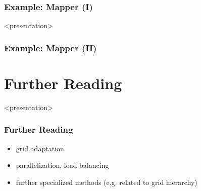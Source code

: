 \documentclass[aspectratio=169,11pt]{beamer}
\theoremstyle{definition}
\begin{document}
\begin{frame} \frametitle{Example: Mapper (I)}
\scriptsize
\begin{codeblock}
  
\end{codeblock}
\end{frame}

\begin{onlyenv}<presentation>
\begin{frame} \frametitle{Example: Mapper (II)}
\scriptsize
\begin{codeblock}
  
\end{codeblock}
\end{frame}
\end{onlyenv}

\section{Further Reading}

\begin{onlyenv}<presentation>
  \begin{frame}
    \frametitle{Further Reading}
    \begin{itemize}
    \item grid adaptation
      \medskip
    \item parallelization, load balancing
      \medskip
    \item further specialized methods (e.g. related to grid hierarchy)
    \end{itemize}
  \end{frame}
\end{onlyenv}
\end{document}
